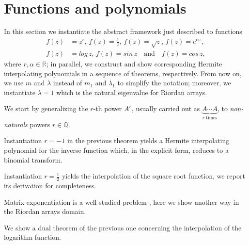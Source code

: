 \section{Functions and polynomials}

In this section we instantiate the abstract framework just described to functions
\begin{displaymath}
\begin{split}
f(z)&=z^{r},\,{f(z)=\frac{1}{z}},\,{f(z)=\sqrt{z}},\,{f(z)=e^{\alpha z}},\\
f(z)&=log\,{z},\,f(z)=sin\,{z}\quad\text{and}\quad f(z)=cos\,{z},
\end{split}
\end{displaymath}
where $r,\alpha\in\mathbb{R}$; in parallel, we construct and show corresponding
Hermite interpolating polynomials in a sequence of theorems, respectively.
From now on, we use $m$ and $\lambda$ instead of $m_{1}$ and $\lambda_{1}$ to
simplify the notation; moreover, we instantiate $\lambda=1$ which is the
natural eigenvalue for Riordan arrays.

We start by generalizing the $r$-th power $A^{r}$, usually carried out
as $\underbrace{A\cdots A}_{r\text{ times}}$, to \textit{non-naturals} powers
$r\in\mathbb{Q}$.



Instantiation $r=-1$ in the previous theorem yields a Hermite interpolating
polynomial for the inverse function which, in the explicit form, reduces to
a binomial transform.



Instantiation $r=\frac{1}{2}$ yields the interpolation of the square root function,
we report its derivation for completeness.



Matrix exponentiation is a well studied problem \citep{MOLERLOAN2003}, here
we show another way in the Riordan arrays domain.



We show a dual theorem of the previous one concerning the interpolation of the
logarithm function.



